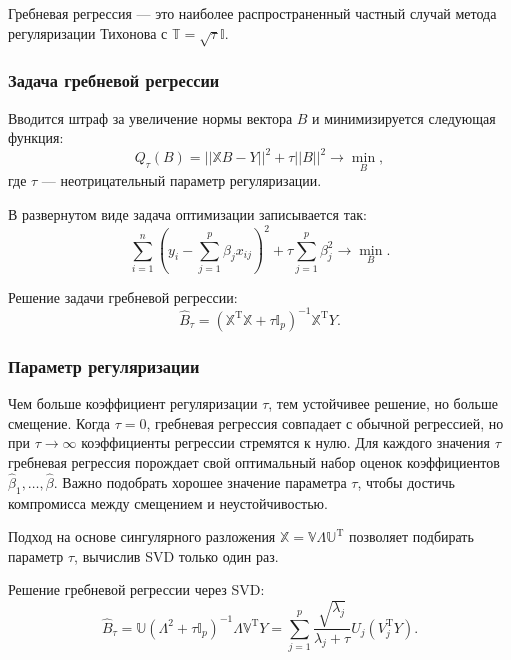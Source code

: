 \documentclass[11pt,colorlinks=true]{article}
\DeclareMathOperator{\T}{T}
\begin{document}
Гребневая регрессия --- это наиболее распространенный частный случай метода регуляризации Тихонова с $\mathbb{T}=\sqrt{\tau}\mathbb{I}$.

\subsubsection{Задача гребневой регрессии}
Вводится штраф за увеличение нормы вектора $B$ и минимизируется следующая функция:
\begin{equation*}
Q_{\tau}(B)
=
||\mathbb{X}B-Y||^{2}
+
\tau||B||^{2}
\rightarrow\min_{B},
\end{equation*}
где $\tau$ --- неотрицательный параметр регуляризации.

В развернутом виде задача оптимизации записывается так:
\begin{equation*}
\sum_{i=1}^{n}
\left(
y_{i}
-
\sum_{j=1}^{p}\beta_{j}x_{ij}
\right)^{2}
+
\tau\sum_{j=1}^{p}\beta_{j}^{2}
\rightarrow\min_{B}.
\end{equation*}


Решение задачи гребневой регрессии:
\begin{equation*}
\hat{B}_{\tau}
=
(\mathbb{X}^{\mathrm{T}}\mathbb{X}+\tau\mathbb{I}_{p})^{-1}\mathbb{X}^{\mathrm{T}}Y.
\end{equation*}



\subsubsection{Параметр регуляризации}
Чем больше коэффициент регуляризации $\tau$, тем устойчивее решение, но больше смещение. 
Когда $\tau = 0$, гребневая регрессия совпадает с обычной регрессией, но при $\tau \rightarrow \infty$ коэффициенты регрессии стремятся к нулю.
Для каждого значения $\tau$ гребневая регрессия порождает свой оптимальный набор оценок коэффициентов $\hat\beta_{1},\ldots,\hat\beta$.
 Важно подобрать хорошее значение параметра $\tau$, чтобы достичь компромисса между смещением и неустойчивостью. 


 Подход на основе сингулярного разложения $\mathbb{X}=\mathbb{V}\mathbb{\Lambda}\mathbb{U^{\mathrm{T}}}$ позволяет подбирать параметр $\tau$, вычислив SVD только один раз.

Решение гребневой регрессии через SVD:
\begin{equation*}
\hat{B}_{\tau} = \mathbb{U}(\mathbb{\Lambda}^2 +\tau \mathbb{I}_{p})^{-1}\mathbb{\Lambda}\mathbb{V}^{\T}Y 
= \sum_{j=1}^p \frac{\sqrt{\lambda_j}}{\lambda_j + \tau} U_j(V_j^{\T}Y).
\end{equation*}
\end{document}
